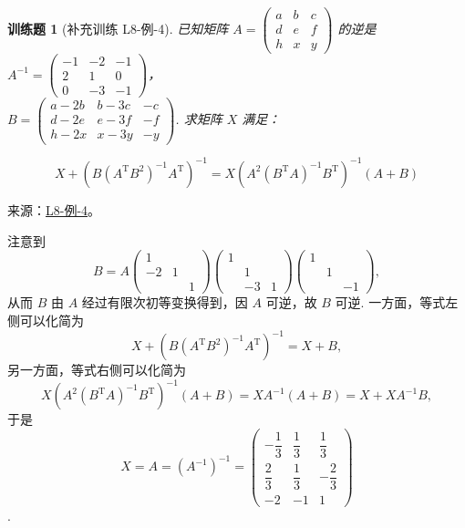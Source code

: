 \documentclass[UTF8,12pt,a4paper,fontset=fandol]{ctexart}
\newtheorem{exercise}{训练题}[section]
\begin{document}
\begin{exercise}[补充训练 L8-例-4]\label{prob:L8-例-4}
已知矩阵 $A=\begin{pmatrix}a & b & c \\ d & e & f \\ h & x & y\end{pmatrix}$ 的逆是 $A^{-1}=\begin{pmatrix}-1 & -2 & -1 \\ 2 & 1 & 0 \\ 0 & -3 & -1\end{pmatrix}$，\\
    $B=\begin{pmatrix}a-2b & b-3c & -c \\ d-2e & e-3f & -f \\ h-2x & x-3y & -y\end{pmatrix}$. 求矩阵 $X$ 满足：

    \[X+\left(B(A^\mathrm{T}B^2)^{-1}A^\mathrm{T}\right)^{-1}=X\left(A^2(B^\mathrm{T}A)^{-1}B^\mathrm{T}\right)^{-1}(A+B)\]
\end{exercise}
\noindent 来源：\href{https://github.com/yhwu-is/Linear-Algebra-Left-Undone/blob/new/%E8%AE%B2%E4%B9%89/%E4%B8%93%E9%A2%98/8%20%E7%9B%B8%E6%8A%B5%E6%A0%87%E5%87%86%E5%BD%A2.tex}{L8-例-4}。
\begin{solve}
注意到
    \[B=A\begin{pmatrix}
            1 &  & \\ -2 & 1 & \\ & & 1
        \end{pmatrix} \begin{pmatrix}
            1 &  & \\ & 1 & \\ & -3 & 1
        \end{pmatrix} \begin{pmatrix}
            1 &  & \\ & 1 & \\ & & -1
        \end{pmatrix},\]
    从而 $B$ 由 $A$ 经过有限次初等变换得到，因 $A$ 可逆，故 $B$ 可逆. 一方面，等式左侧可以化简为
    \[X + \left(B\left(A^\mathrm{T} B^{2}\right)^{-1} A^\mathrm{T}\right)^{-1} = X + B,\]
    另一方面，等式右侧可以化简为
    \[X\left(A^{2}\left(B^\mathrm{T} A\right)^{-1} B^\mathrm{T}\right)^{-1}(A + B) = X A^{-1}(A + B) = X + X A^{-1} B,\]
    于是 
\[X = A = (A^{-1})^{-1} = \begin{pmatrix}
            -\dfrac{1}{3} & \dfrac{1}{3} & \dfrac{1}{3}  \\[0.5em]
            \dfrac{2}{3}  & \dfrac{1}{3} & -\dfrac{2}{3} \\
            -2           & -1          & 1
        \end{pmatrix}\]
.
\end{solve}
\end{document}
